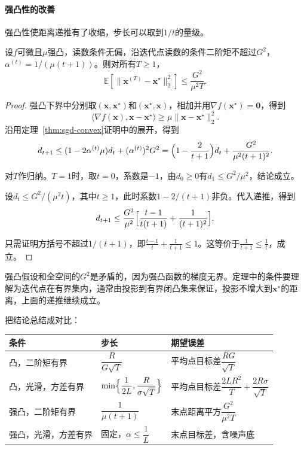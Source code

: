 \paragraph{强凸性的改善}
强凸性使距离递推有了收缩，步长可以取到$1/t$的量级。

\begin{theorem}[强凸目标的递减步长]
\label{thm:sgd-strong-decay}
设$f$可微且$\mu$强凸，读数条件无偏，沿迭代点读数的条件二阶矩不超过$G^2$，$\alpha^{(t)}=1/(\mu(t+1))$。则对所有$T\geq1$，
\begin{equation}
 \mathbb{E}[\lVert\bm{x}^{(T)}-\bm{x}^\star\rVert_2^2]\leq\frac{G^2}{\mu^2T}.
 \label{eq:sgd-strong-rate}
\end{equation}
\end{theorem}

\begin{proof}
强凸下界中分别取$(\bm{x},\bm{x}^\star)$和$(\bm{x}^\star,\bm{x})$，相加并用$\nabla f(\bm{x}^\star)=\bm{0}$，得到
\[
 \langle\nabla f(\bm{x}),\bm{x}-\bm{x}^\star\rangle\geq\mu\lVert\bm{x}-\bm{x}^\star\rVert_2^2.
\]
沿用定理~\ref{thm:sgd-convex}证明中的展开，得到
\[
 d_{t+1}\leq(1-2\alpha^{(t)}\mu)d_t+(\alpha^{(t)})^2G^2=\Bigl(1-\frac{2}{t+1}\Bigr)d_t+\frac{G^2}{\mu^2(t+1)^2}.
\]

对$T$作归纳。$T=1$时，取$t=0$，系数是$-1$，由$d_0\geq0$有$d_1\leq G^2/\mu^2$，结论成立。

设$d_t\leq G^2/(\mu^2t)$，其中$t\geq1$，此时系数$1-2/(t+1)$非负。代入递推，得到
\[
 d_{t+1}\leq\frac{G^2}{\mu^2}\Bigl[\frac{t-1}{t(t+1)}+\frac{1}{(t+1)^2}\Bigr].
\]

只需证明方括号不超过$1/(t+1)$，即$\tfrac{t-1}{t}+\tfrac{1}{t+1}\leq1$。这等价于$\tfrac{1}{t+1}\leq\tfrac{1}{t}$，成立。
\end{proof}

强凸假设和全空间的$G^2$是矛盾的，因为强凸函数的梯度无界。定理中的条件要理解为迭代点在有界集内，通常由投影到有界闭凸集来保证，投影不增大到$\bm{x}^\star$的距离，上面的递推继续成立。

把结论总结成对比：

\begin{BookInlineTable}
  \centering
  \begin{tabular}{lll}
    \toprule
    条件 & 步长 & 期望误差\\
    \midrule
    凸，二阶矩有界 & $\dfrac{R}{G\sqrt{T}}$ & 平均点目标差$\dfrac{RG}{\sqrt{T}}$\\\addlinespace[2.5mm]
    凸，光滑，方差有界 & $\min\Bigl\{\dfrac{1}{2L},\dfrac{R}{\sigma\sqrt{T}}\Bigr\}$ & 平均点目标差$\dfrac{2LR^2}{T}+\dfrac{2R\sigma}{\sqrt{T}}$\\\addlinespace[2.5mm]
    强凸，二阶矩有界 & $\dfrac{1}{\mu(t+1)}$ & 末点距离平方$\dfrac{G^2}{\mu^2T}$\\\addlinespace[2.5mm]
    强凸，光滑，方差有界 & 固定，$\alpha\leq\dfrac1L$ & 末点目标差，含噪声底\\
    \bottomrule
  \end{tabular}
  \caption{本小节及上一小节的保证。表中“末点”指最后一个迭代点，“光滑”指梯度$L$-Lipschitz。前两行的结论针对平均点，后两行针对末点。}
  \label{tab:sgd-rates}
\end{BookInlineTable}

